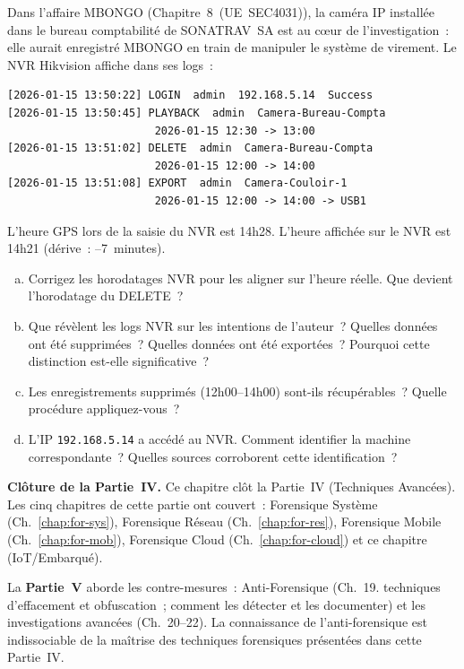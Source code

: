 \begin{boxexo}[title={\ding{45}\quad Exercice~18.3. Timeline IoT multi-sources \niveauexpert}]
Dans l'affaire MBONGO (Chapitre~8~(UE~SEC4031)), la caméra IP
installée dans le bureau comptabilité de SONATRAV~SA est au c\oe ur
de l'investigation~: elle aurait enregistré MBONGO en train de
manipuler le système de virement. Le NVR Hikvision affiche dans
ses logs~:
\begin{lstlisting}[language=bash_forensique]
[2026-01-15 13:50:22] LOGIN  admin  192.168.5.14  Success
[2026-01-15 13:50:45] PLAYBACK  admin  Camera-Bureau-Compta
                       2026-01-15 12:30 -> 13:00
[2026-01-15 13:51:02] DELETE  admin  Camera-Bureau-Compta
                       2026-01-15 12:00 -> 14:00
[2026-01-15 13:51:08] EXPORT  admin  Camera-Couloir-1
                       2026-01-15 12:00 -> 14:00 -> USB1
\end{lstlisting}
L'heure GPS lors de la saisie du NVR est 14h28. L'heure affichée
sur le NVR est 14h21 (dérive~: --7~minutes).
\begin{enumerate}[(a)]
    \item Corrigez les horodatages NVR pour les aligner sur l'heure
          réelle. Que devient l'horodatage du DELETE~?
    \item Que révèlent les logs NVR sur les intentions de l'auteur~?
          Quelles données ont été supprimées~? Quelles données
          ont été exportées~? Pourquoi cette distinction est-elle
          significative~?
    \item Les enregistrements supprimés (12h00--14h00) sont-ils
          récupérables~? Quelle procédure appliquez-vous~?
    \item L'IP \texttt{192.168.5.14} a accédé au NVR. Comment
          identifier la machine correspondante~? Quelles sources
          corroborent cette identification~?
\end{enumerate}
\end{boxexo}

\bigskip

\begin{boxinfo}
\textbf{Clôture de la Partie~IV.} Ce chapitre clôt la Partie~IV
(Techniques Avancées). Les cinq chapitres de cette partie ont
couvert~: Forensique Système (Ch.~\ref{chap:for-sys}), Forensique
Réseau (Ch.~\ref{chap:for-res}), Forensique Mobile
(Ch.~\ref{chap:for-mob}), Forensique Cloud (Ch.~\ref{chap:for-cloud})
et ce chapitre (IoT/Embarqué).

La \textbf{Partie~V} aborde les contre-mesures~: Anti-Forensique
(Ch.~19. techniques d'effacement et obfuscation~; comment les
détecter et les documenter) et les investigations avancées
(Ch.~20--22). La connaissance de l'anti-forensique est indissociable
de la maîtrise des techniques forensiques présentées dans
cette Partie~IV.
\end{boxinfo}
